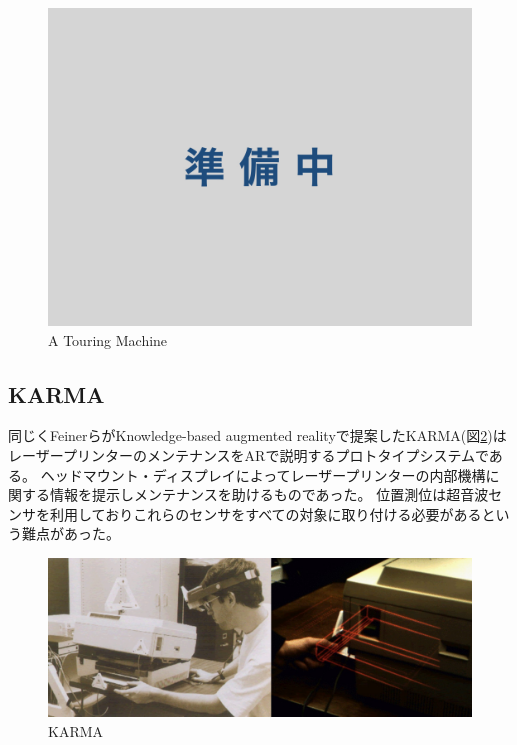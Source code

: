 \begin{figure}[h]
  \centering 
  \includegraphics[width=150mm]{images/wip.jpg}
  \caption{A Touring Machine} \label{fig:a_touring_machine}
\end{figure}


\subsection{KARMA}
同じくFeinerらがKnowledge-based augmented reality\cite{10.1145/159544.159587}で提案したKARMA(図\ref{fig:karma})はレーザープリンターのメンテナンスをARで説明するプロトタイプシステムである。
ヘッドマウント・ディスプレイによってレーザープリンターの内部機構に関する情報を提示しメンテナンスを助けるものであった。
位置測位は超音波センサを利用しておりこれらのセンサをすべての対象に取り付ける必要があるという難点があった。

\begin{figure}[h]
  \centering
  \includegraphics[width=150mm]{images/karma.jpg}
  \caption{KARMA} \label{fig:karma}
\end{figure}


